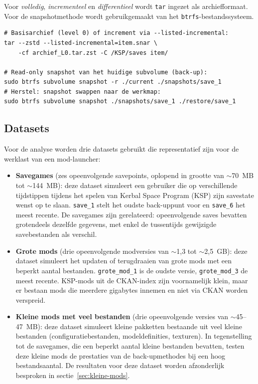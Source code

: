 Voor \emph{volledig}, \emph{incrementeel} en \emph{differentieel} wordt \texttt{tar} ingezet als archiefformaat. Voor de snapshotmethode wordt gebruikgemaakt van het \texttt{btrfs}-bestandssysteem.

\begin{listing}[h]
\begin{verbatim}
# Basisarchief (level 0) of increment via --listed-incremental:
tar --zstd --listed-incremental=item.snar \
    -cf archief_L0.tar.zst -C /KSP/saves item/

# Read-only snapshot van het huidige subvolume (back-up):
sudo btrfs subvolume snapshot -r ./current ./snapshots/save_1
# Herstel: snapshot swappen naar de werkmap:
sudo btrfs subvolume snapshot ./snapshots/save_1 ./restore/save_1
\end{verbatim}
\caption{Kerncommando's voor de incrementele tar+zstd-methode (boven) en de btrfs-snapshotmethode (onder). Het snar-bestand houdt bij welke bestanden gewijzigd zijn ten opzichte van de vorige back-up.}
\label{lst:backup-core-commands}
\end{listing}

\subsection{Datasets}
\label{subsec:datasets}

Voor de analyse worden drie datasets gebruikt die representatief zijn voor de werklast van een mod-launcher:

\begin{itemize}
    \item \textbf{Savegames} (zes opeenvolgende savepoints, oplopend in grootte van $\sim$70~MB tot $\sim$144~MB): deze dataset simuleert een gebruiker die op verschillende tijdstippen tijdens het spelen van Kerbal Space Program (KSP) zijn savestate wenst op te slaan. \texttt{save\_1} stelt het oudste back-uppunt voor en \texttt{save\_6} het meest recente. De savegames zijn gerelateerd: opeenvolgende saves bevatten grotendeels dezelfde gegevens, met enkel de tussentijds gewijzigde savebestanden als verschil.
    \item \textbf{Grote mods} (drie opeenvolgende modversies van $\sim$1{,}3 tot $\sim$2{,}5~GB): deze dataset simuleert het updaten of terugdraaien van grote mods met een beperkt aantal bestanden. \texttt{grote\_mod\_1} is de oudste versie, \texttt{grote\_mod\_3} de meest recente. KSP-mods uit de CKAN-index zijn voornamelijk klein, maar er bestaan mods die meerdere gigabytes innemen en niet via CKAN worden verspreid.
    \item \textbf{Kleine mods met veel bestanden} (drie opeenvolgende versies van $\sim$45--47~MB): deze dataset simuleert kleine pakketten bestaande uit veel kleine bestanden (configuratiebestanden, modeldefinities, texturen). In tegenstelling tot de savegames, die een beperkt aantal kleine bestanden bevatten, testen deze kleine mods de prestaties van de back-upmethodes bij een hoog bestandsaantal. De resultaten voor deze dataset worden afzonderlijk besproken in sectie~\ref{sec:kleine-mods}.
\end{itemize}

